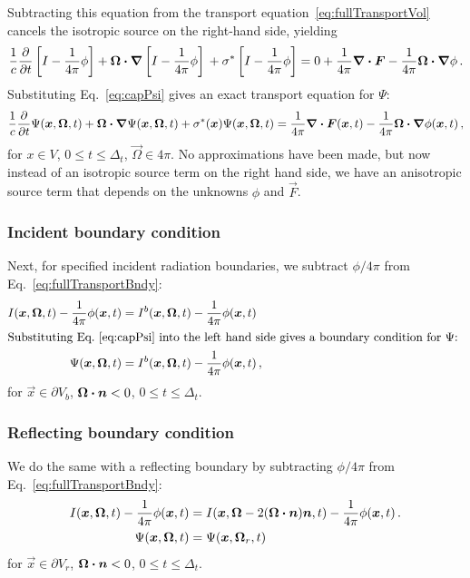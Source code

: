 Subtracting this equation from the transport
equation~\eqref{eq:fullTransportVol} cancels the isotropic source on the
right-hand side, yielding
\begin{equation*}
  \frac{1}{c} \pder{}{t}\left[ I
  - \frac{1}{4\pi} \phi \right]
    + \vec{\Omega}\vd \grad \left[ I
  - \frac{1}{4\pi} \phi \right]
  \\  + \sigma^\ast \left[ I
  - \frac{1}{4\pi} \phi \right]
  = 0 + \frac{1}{4\pi} \grad \vd\vec{F} -
  \frac{1}{4\pi} \vec{\Omega}\vd \grad \phi\,.
\end{equation*}
Substituting Eq.~\eqref{eq:capPsi} gives an exact transport equation for $\Psi$:
\begin{equation} \label{eq:capPsiVol}
  \frac{1}{c} \pder{}{t}\Psi(\vec{x}, \vec{\Omega}, t)
    + \vec{\Omega}\vd \grad \Psi(\vec{x}, \vec{\Omega}, t)
    + \sigma^\ast(\vec{x}) \Psi(\vec{x}, \vec{\Omega}, t)
  = \frac{1}{4\pi} \grad \vd\vec{F}(\vec{x}, t) -
  \frac{1}{4\pi} \vec{\Omega}\vd \grad \phi(\vec{x}, t)\,,
\end{equation}
for $x \in V$, $0 \le t \le \Delta_t$, $\vec{\Omega} \in 4\pi$.
No approximations have been made, but now instead of an isotropic source term
on the right hand side, we have an anisotropic source term that depends on the
unknowns $\phi$ and $\vec{F}$.

\subsubsection{Incident boundary condition}
Next, for specified incident radiation boundaries, we subtract $\phi/4\pi$ from 
Eq.~\eqref{eq:fullTransportBndy}:
\begin{align}\nonumber
  I(\vec{x}, \vec{\Omega}, t) - \frac{1}{4\pi} \phi(\vec{x}, t)
  &= I^b(\vec{x}, \vec{\Omega}, t) - \frac{1}{4\pi} \phi(\vec{x}, t)
  \\ 
  \intertext{Substituting Eq.~\eqref{eq:capPsi} into the left hand side gives a
  boundary condition for $\Psi$:
  } \label{eq:capPsiBndy}
 \Psi(\vec{x}, \vec{\Omega}, t) 
  &=I^b(\vec{x}, \vec{\Omega}, t) - \frac{1}{4\pi} \phi(\vec{x}, t)\,,
\end{align}
for $\vec{x} \in \partial V_b$, $\vec{\Omega} \vd \vec{n} < 0$,
$0 \le t \le \Delta_t$.

\subsubsection{Reflecting boundary condition}
We do the same with a reflecting boundary by subtracting $\phi/4\pi$ from 
Eq.~\eqref{eq:fullTransportBndy}:
\begin{align}\nonumber
  I(\vec{x}, \vec{\Omega}, t) - \frac{1}{4\pi} \phi(\vec{x}, t)
  &= I(\vec{x}, \vec{\Omega} - 2(\vec{\Omega} \vd \vec{n}) \vec{n}, t)
   - \frac{1}{4\pi} \phi(\vec{x}, t)\,.
  \\ \label{eq:capPsiRefl}
 \Psi(\vec{x}, \vec{\Omega}, t) 
  &= \Psi(\vec{x}, \vec{\Omega}_r, t)
\end{align}
for $\vec{x} \in \partial V_r$, $\vec{\Omega} \vd \vec{n} < 0$,
$0 \le t \le \Delta_t$.

